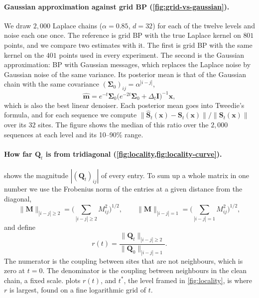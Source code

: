 \documentclass{article}
\begin{document}
\paragraph{Gaussian approximation against grid BP (\cref{fig:grid-vs-gaussian}).} We draw $2{,}000$ Laplace chains
($\alpha=0.85$, $d=32$) for each of the twelve levels and noise each one once. The reference is grid BP with the true
Laplace kernel on $801$ points, and we compare two estimates with it. The first is grid BP with the same kernel on the
$401$ points used in every experiment. The second is the Gaussian approximation: BP with Gaussian messages, which
replaces the Laplace noise by Gaussian noise of the same variance. Its posterior mean is that of the Gaussian chain with
the same covariance $(\boldsymbol\Sigma_0)_{ij}=\alpha^{|i-j|}$,
\begin{equation}
  \widehat{\mathbf m}=e^{-t}\boldsymbol\Sigma_0\big(e^{-2t}\boldsymbol\Sigma_0+\Delta_t\mathbf I\big)^{-1}\mathbf x,
\end{equation}
which is also the best linear denoiser. Each posterior mean goes into Tweedie's formula, and for each sequence we
compute $\|\widehat{\mathbf S}_t(\mathbf x)-\mathbf S_t(\mathbf x)\|/\|\mathbf S_t(\mathbf x)\|$ over its $32$
sites. The figure shows the median of this ratio over the $2{,}000$ sequences at each level and its 10--90\% range.

\paragraph{How far $\mathbf Q_t$ is from tridiagonal (\cref{fig:locality,fig:locality-curve}).} 
shows the magnitude $|(\mathbf Q_t)_{ij}|$ of every entry. To sum up a whole matrix in one number we use the Frobenius
norm of the entries at a given distance from the diagonal,
\begin{equation}
  \|\mathbf M\|_{|i-j|\ge2}=\Big(\sum_{|i-j|\ge2}M_{ij}^2\Big)^{1/2},
  \qquad
  \|\mathbf M\|_{|i-j|=1}=\Big(\sum_{|i-j|=1}M_{ij}^2\Big)^{1/2},
\end{equation}
and define
\begin{equation}
  r(t)=\frac{\|\mathbf Q_t\|_{|i-j|\ge2}}{\|\mathbf Q_0\|_{|i-j|=1}} .
\end{equation}
The numerator is the coupling between sites that are not neighbours, which is zero at $t=0$. The denominator is the
coupling between neighbours in the clean chain, a fixed scale.  plots $r(t)$, and $t^{*}$,
the level framed in \cref{fig:locality}, is where $r$ is largest, found on a fine logarithmic grid of $t$.
\end{document}

